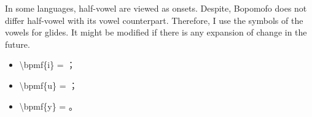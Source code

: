 In some languages, half-vowel are viewed as onsets. Despite, Bopomofo does not differ half-vowel with its vowel counterpart. Therefore, I use the symbols of the vowels for glides. It might be modified if there is any expansion of change in the future. \par
\begin{itemize}
	\item {\textbackslash}bpmf\{i\} = ；
	\item {\textbackslash}bpmf\{u\} = ；
	\item {\textbackslash}bpmf\{y\} = 。
\end{itemize}

\clearpage